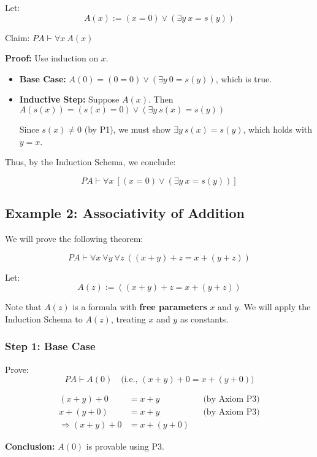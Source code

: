 \documentclass[12pt]{article}
\begin{document}
Let:
\[
A(x) := (x = 0) \vee (\exists y\ x = s(y))
\]

Claim: \( PA \vdash \forall x\ A(x) \)

\textbf{Proof:} Use induction on \( x \).

\begin{itemize}
  \item \textbf{Base Case:} \( A(0) = (0 = 0) \vee (\exists y\ 0 = s(y)) \), which is true.
  \item \textbf{Inductive Step:} Suppose \( A(x) \). Then \( A(s(x)) = (s(x) = 0) \vee (\exists y\ s(x) = s(y)) \)

  Since \( s(x) \neq 0 \) (by P1), we must show \( \exists y\ s(x) = s(y) \), which holds with \( y = x \).
\end{itemize}

Thus, by the Induction Schema, we conclude:

\[
PA \vdash \forall x\ [(x = 0) \vee (\exists y\ x = s(y))]
\]

\subsection{Example 2: Associativity of Addition}

We will prove the following theorem:

\[
PA \vdash \forall x\ \forall y\ \forall z\ ((x + y) + z = x + (y + z))
\]

Let:
\[
A(z) := ((x + y) + z = x + (y + z))
\]

Note that \( A(z) \) is a formula with \textbf{free parameters} \( x \) and \( y \). We will apply the Induction Schema to \( A(z) \), treating \( x \) and \( y \) as constants.

\subsubsection*{Step 1: Base Case}

Prove:
\[
PA \vdash A(0) \quad \text{(i.e., } (x + y) + 0 = x + (y + 0) \text{)}
\]

\begin{align*}
(x + y) + 0 &= x + y && \text{(by Axiom P3)} \\
x + (y + 0) &= x + y && \text{(by Axiom P3)} \\
\Rightarrow (x + y) + 0 &= x + (y + 0)
\end{align*}

\textbf{Conclusion:} \( A(0) \) is provable using P3.
\end{document}
